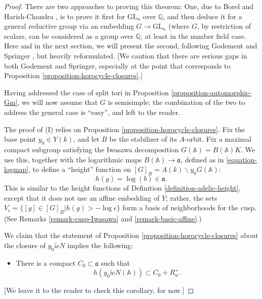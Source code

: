 \begin{proof}
There are two approaches to proving this theorem: One, due to Borel and Harish-Chandra \cite{Borel-HC}, is to prove it first for $\text{GL}_n$ over $\mathbb Q$, and then deduce it for a general reductive group via an embedding $G\to \text{GL}_n$ (where $G$, by restriction of scalars, can be considered as a group over $\mathbb Q$, at least in the number field case. Here and in the next section, we will present the second, following Godement \cite{Godement-domaines-fondamentaux} and Springer \cite{Springer-reduction-theory}, but heavily reformulated. [We caution that there are serious gaps in both Godement and Springer, especially at the point that corresponds to Proposition \ref{proposition-horocycle-closures}.]

Having addressed the case of split tori in Proposition \ref{proposition-automorphic-Gm}, we will now assume that $G$ is semisimple; the combination of the two to address the general case is ``easy'', and left to the reader. 



The proof of (I) relies on Proposition \ref{proposition-horocycle-closures}.  Fix the base point $y_0\in Y(k)$, and let $B$ be the stabilizer of its $A$-orbit. Fix a maximal compact subgroup satisfying the Iwasawa decomposition $G(\mathbb A) = B(\mathbb A) K$. We use this, together with the logarithmic maps $B(\mathbb A)\to \mathfrak a$, defined as in \eqref{equation-logmap}, to define a ``height'' function  on $[G]_B = A(k)\backslash y_0 G(\mathbb A)$:
$$h(g) = \log(b)\in \mathfrak a.$$ 
This is similar to the height functions of Definition \ref{definition-adelic-height}, except that it does not use an affine embedding of $Y$; rather, the sets $V_\epsilon = \{ [g] \in [G]_B| h(g) > -\log \epsilon\}$ form a basis of neighborhoods for the cusp. (See Remarks  \ref{remark-cusp-Iwasawa} and \ref{remark-basic-affine}.)

We claim that the statement of Proposition \ref{proposition-horocycle-closures} about the closure of $y_0 \tilde w N$ implies the following:

\begin{itemize}
 \item There is a compact $C_0\subset \mathfrak a$ such that 
\begin{equation}
 \label{equation-bound-height}
h(y_0 \tilde w N(\mathbb A)) \subset C_0 + R_w^+.
\end{equation}
\end{itemize}
[We leave it to the reader to check this corollary, for now.]



\end{proof}
